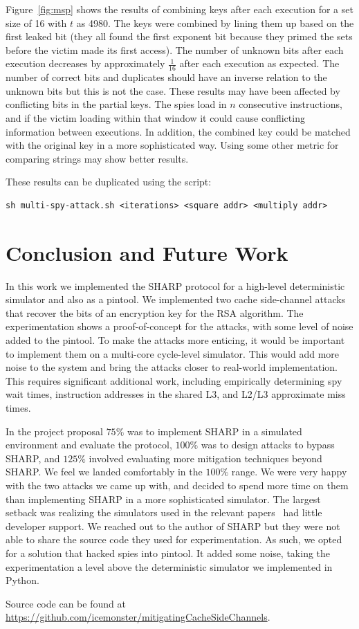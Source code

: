 \documentclass[12pt]{article}
\begin{document}
Figure~\ref{fig:msp} shows the results of combining keys after each execution for a set size of 16 with $t$ as 4980. 
The keys were combined by lining them up based on the first leaked bit (they all found the first exponent bit because they primed the sets before the victim made its first access). 
The number of unknown bits after each execution decreases by approximately $\frac{1}{16}$ after each execution as expected.
The number of correct bits and duplicates should have an inverse relation to the unknown bits but this is not the case.
These results may have been affected by conflicting bits in the partial keys.
The spies load in $n$ consecutive instructions, and if the victim loading within that window it could cause conflicting information between executions.
In addition, the combined key could be matched with the original key in a more sophisticated way.
Using some other metric for comparing strings may show better results.

These results can be duplicated using the script:
\begin{verbatim}
sh multi-spy-attack.sh <iterations> <square addr> <multiply addr> 
\end{verbatim}

\section{Conclusion and Future Work}

In this work we implemented the SHARP protocol for a high-level deterministic simulator and also as a pintool.
We implemented two cache side-channel attacks that recover the bits of an encryption key for the RSA algorithm.
The experimentation shows a proof-of-concept for the attacks, with some level of noise added to the pintool.
To make the attacks more enticing, it would be important to implement them on a multi-core cycle-level simulator.
This would add more noise to the system and bring the attacks closer to real-world implementation.
This requires significant additional work, including empirically determining spy wait times, instruction addresses in the shared L3, and L2/L3 approximate miss times.

In the project proposal $75\%$ was to implement SHARP in a simulated environment and evaluate the protocol, $100\%$ was to design attacks to bypass SHARP, and $125\%$ involved evaluating more mitigation techniques beyond SHARP. 
We feel we landed comfortably in the $100\%$ range.
We were very happy with the two attacks we came up with, and decided to spend more time on them than implementing SHARP in a more sophisticated simulator.
The largest setback was realizing the simulators used in the relevant papers~\cite{sharp,howSharp} had little developer support.
We reached out to the author of SHARP but they were not able to share the source code they used for experimentation.
As such, we opted for a solution that hacked spies into pintool.
It added some noise, taking the experimentation a level above the deterministic simulator we implemented in Python.

Source code can be found at\\ \url{https://github.com/icemonster/mitigatingCacheSideChannels}.


\newpage



\end{document}
